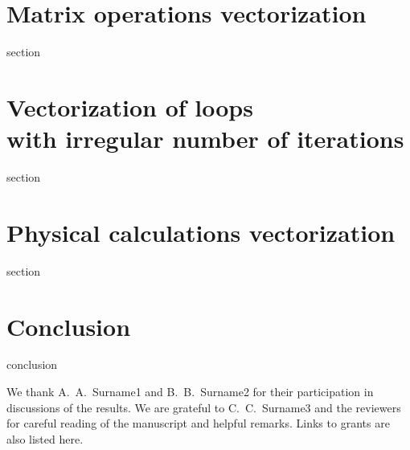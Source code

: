 \documentclass[
11pt,%
tightenlines,%
twoside,%
onecolumn,%
nofloats,%
nobibnotes,%
nofootinbib,%
superscriptaddress,%
noshowpacs,%
centertags]%
{revtex4}
\begin{document}
\section{Matrix operations vectorization}

section

\section{Vectorization of loops \protect\\
with irregular number of iterations}

section

\section{Physical calculations vectorization}

section

\section{Conclusion}

conclusion

\begin{acknowledgments}
We thank A.~A.~Surname1 and B.~B.~Surname2 for their participation in discussions of the results. We are grateful to C.~C.~Surname3 and the reviewers for careful reading of the manuscript and helpful remarks. Links to grants are also listed here.
\end{acknowledgments}
\end{document}
